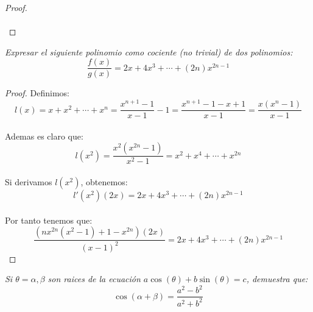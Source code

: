 \documentclass[11pt,letterpaper]{article}
\begin{document}
\begin{proof}\,\\
    \,\\
\end{proof}
\begin{tcolorbox}[title=Problema 3, colframe=G, coltitle=B, fonttitle=\bfseries]
\textit{Expresar el siguiente polinomio como cociente (no trivial) de dos polinomios:
\begin{equation*}
  \frac{f(x)}{g(x)}=2x+4x^3+\cdots+(2n)x^{2n-1}
\end{equation*}}  
\end{tcolorbox}
\begin{proof}
    Definimos:\,\\
    \begin{equation*}
        l(x)=x+x^2+\cdots+x^n=\frac{x^{n+1}-1}{x-1}-1=\frac{x^{n+1}-1-x+1}{x-1}=\frac{x(x^n-1)}{x-1}
    \end{equation*}\,\\
    Ademas es claro que:
    \begin{equation*}
        l(x^2)=\frac{x^2(x^{2n}-1)}{x^{2}-1}=x^2+x^4+\cdots+x^{2n}
    \end{equation*}\,\\
    Si derivamos $l(x^2)$, obtenemos:\,\\
    \begin{equation*}
        l'(x^2)(2x)=2x+4x^3+\cdots+(2n)x^{2n-1}
    \end{equation*}\,\\
    Por tanto tenemos que:\,\\
    \begin{equation*}
        \frac{(nx^{2n}(x^2-1)+1-x^{2n})(2x)}{(x-1)^2}=2x+4x^3+\cdots+(2n)x^{2n-1}
    \end{equation*}
\end{proof}
\begin{tcolorbox}[title=Problema 4, colframe=G, coltitle=B, fonttitle=\bfseries]
\textit{Si $\theta=\alpha,\beta$ son raices de la ecuaci\'on $a\cos(\theta)+b\sin(\theta)=c$, demuestra que:
\begin{equation*}
  \cos(\alpha+\beta)=\frac{a^2-b^2}{a^2+b^2}
\end{equation*}}  
\end{tcolorbox}
\end{document}
